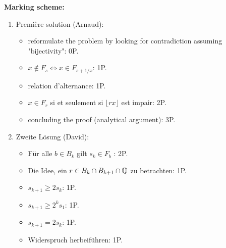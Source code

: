 \textbf{Marking scheme:}

\begin{enumerate}

    \item Première solution (Arnaud):
    \begin{itemize}
    \item reformulate the problem by looking for contradiction assuming "bijectivity": 0P.
    \item $x\notin F_s \Leftrightarrow x\in F_{s+1/x}$: 1P.
    \item relation d'alternance: 1P.
    \item $x\in F_r$ si et seulement si $\lfloor rx\rfloor$ est impair: 2P.
    
    \item concluding the proof (analytical argument): 3P.
    \end{itemize}

    \item Zweite Lösung (David):
    \begin{itemize}
    \item Für alle $b\in B_k$ gilt $s_k\in F_b$ : 2P.
    \item Die Idee, ein $r\in B_k\cap B_{k+1}\cap \mathbb{Q}$ zu betrachten: 1P.
    \item $s_{k+1}\geq 2s_k$: 1P.
    \item $s_{k+1} \geq 2^k s_1$: 1P.
    \item $s_{k+1} = 2s_k$: 1P.
    \item Widerspruch herbeiführen: 1P.
    \end{itemize}
\end{enumerate}